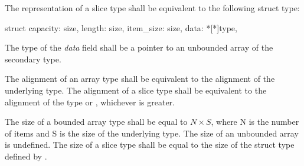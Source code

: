 \specsubsubitem
The representation of a slice type shall be equivalent to the following struct
type:

\begin{codesample}
struct {
	capacity: size,
	length: size,
	item_size: size,
	data: *[*]type,
}
\end{codesample}

The type of the \textit{data} field shall be a pointer to an unbounded array of
the secondary type.

\specsubsubitem
The alignment of an array type shall be equivalent to the alignment of the
underlying type. The alignment of a slice type shall be equivalent to the
alignment of the  type or , whichever is
greater.

\specsubsubitem
The size of a bounded array type shall be equal to $N \times S$, where N is the
number of items and S is the size of the underlying type. The size of an
unbounded array is undefined. The size of a slice type shall be equal to the
size of the struct type defined by .


\begin{grammar}
 \\
	  \\

 \\
	 \\
	\terminal{(}  \terminal{)}  \\

 \\
	 \optional{\terminal{,}} \\
	 \terminal{,}  \\
	 \terminal{,}  \\

 \\
	 \terminal{:}  \\
	 \\
	  \\
\end{grammar}

